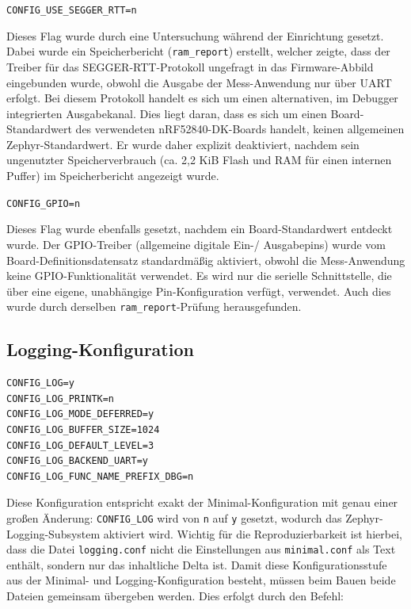 \lstinline[style=codeinline]|CONFIG_USE_SEGGER_RTT=n|

Dieses Flag wurde durch eine Untersuchung w{\"a}hrend der Einrichtung gesetzt. Dabei wurde ein Speicherbericht (\lstinline[style=codeinline]|ram_report|) erstellt, welcher zeigte, dass der Treiber f{\"u}r das SEGGER-RTT-Protokoll ungefragt in das Firmware-Abbild eingebunden wurde, obwohl die Ausgabe der Mess-Anwendung nur {\"u}ber UART erfolgt. Bei diesem Protokoll handelt es sich um einen alternativen, im Debugger integrierten Ausgabekanal. Dies liegt daran, dass es sich um einen Board-Standardwert des verwendeten nRF52840-DK-Boards handelt, keinen allgemeinen Zephyr-Standardwert. Er wurde daher explizit deaktiviert, nachdem sein ungenutzter Speicherverbrauch (ca. 2,2 KiB Flash und RAM f{\"u}r einen internen Puffer) im Speicherbericht angezeigt wurde.

\lstinline[style=codeinline]|CONFIG_GPIO=n|

Dieses Flag wurde ebenfalls gesetzt, nachdem ein Board-Standardwert entdeckt wurde. Der GPIO-Treiber (allgemeine digitale Ein-/ Ausgabepins) wurde vom Board-Definitionsdatensatz standardm{\"a}{\ss}ig aktiviert, obwohl die Mess-Anwendung keine GPIO-Funktionalit{\"a}t verwendet. Es wird nur die serielle Schnittstelle, die {\"u}ber eine eigene, unabh{\"a}ngige Pin-Konfiguration verf{\"u}gt, verwendet. Auch dies wurde durch derselben \lstinline[style=codeinline]|ram_report|-Pr{\"u}fung herausgefunden.

\subsection{Logging-Konfiguration}
\begin{lstlisting}[style=basecode,language=Kconfig]
CONFIG_LOG=y
CONFIG_LOG_PRINTK=n
CONFIG_LOG_MODE_DEFERRED=y
CONFIG_LOG_BUFFER_SIZE=1024
CONFIG_LOG_DEFAULT_LEVEL=3
CONFIG_LOG_BACKEND_UART=y
CONFIG_LOG_FUNC_NAME_PREFIX_DBG=n
\end{lstlisting}
Diese Konfiguration entspricht exakt der Minimal-Konfiguration mit genau einer gro{\ss}en {\"A}nderung: \lstinline[style=codeinline]|CONFIG_LOG| wird von \lstinline[style=codeinline]|n| auf \lstinline[style=codeinline]|y| gesetzt, wodurch das Zephyr-Logging-Subsystem aktiviert wird. Wichtig f{\"u}r die Reproduzierbarkeit ist hierbei, dass die Datei \lstinline[style=codeinline]|logging.conf| nicht die Einstellungen aus \lstinline[style=codeinline]|minimal.conf| als Text enth{\"a}lt, sondern nur das inhaltliche Delta ist. Damit diese Konfigurationsstufe aus der Minimal- und Logging-Konfiguration besteht, m{\"u}ssen beim Bauen beide Dateien gemeinsam {\"u}bergeben werden. Dies erfolgt durch den Befehl:


